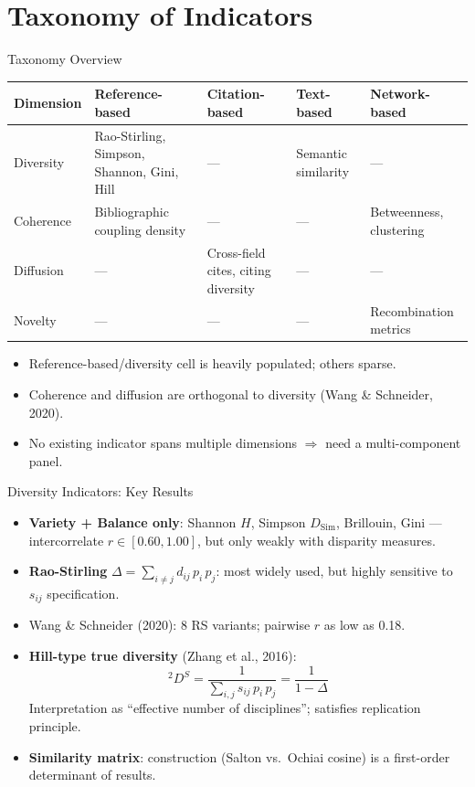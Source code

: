\documentclass[aspectratio=169,10pt]{beamer}
\begin{document}
\section{Taxonomy of Indicators}

\begin{frame}{Taxonomy Overview}
\small
\begin{table}
\centering
\begin{tabular}{@{}l p{2.9cm} p{2.9cm} p{2.2cm} p{2.5cm}@{}}
\toprule
\textbf{Dimension} & \textbf{Reference-based} & \textbf{Citation-based}
  & \textbf{Text-based} & \textbf{Network-based} \\
\midrule
Diversity  & Rao-Stirling, Simpson, Shannon, Gini, Hill & --- & Semantic similarity & --- \\
Coherence  & Bibliographic coupling density & --- & --- & Betweenness, clustering \\
Diffusion  & --- & Cross-field cites, citing diversity & --- & --- \\
Novelty    & --- & --- & --- & Recombination metrics \\
\bottomrule
\end{tabular}
\end{table}
\medskip
\begin{itemize}
  \item Reference-based/diversity cell is heavily populated; others sparse.
  \item Coherence and diffusion are orthogonal to diversity (Wang \& Schneider, 2020).
  \item No existing indicator spans multiple dimensions $\Rightarrow$
        need a multi-component panel.
\end{itemize}
\end{frame}

\begin{frame}{Diversity Indicators: Key Results}
\begin{itemize}
  \item \textbf{Variety + Balance only}: Shannon $H$, Simpson $D_\mathrm{Sim}$,
        Brillouin, Gini --- intercorrelate $r \in [0.60, 1.00]$, but only
        weakly with disparity measures.
  \item \textbf{Rao-Stirling} $\Delta = \sum_{i\neq j} d_{ij}\,p_i\,p_j$:
        most widely used, but highly sensitive to $s_{ij}$ specification.
  \item Wang \& Schneider (2020): 8 RS variants; pairwise $r$ as low as 0.18.
  \item \textbf{Hill-type true diversity} (Zhang et al., 2016):
  \[
    {}^2D^S = \frac{1}{\sum_{i,j} s_{ij}\,p_i\,p_j} = \frac{1}{1-\Delta}
  \]
  Interpretation as ``effective number of disciplines'';
  satisfies replication principle.
  \item \textbf{Similarity matrix}: construction (Salton vs.\ Ochiai cosine)
        is a first-order determinant of results.
\end{itemize}
\end{frame}
\end{document}
